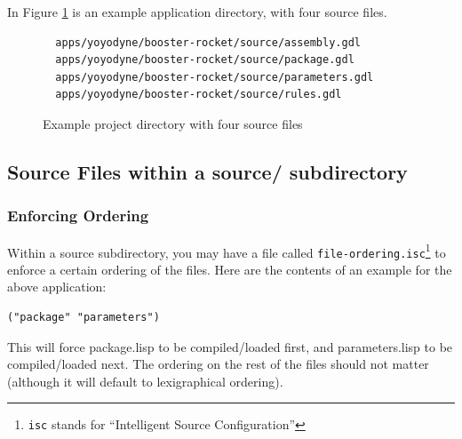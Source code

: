 \documentclass [11pt]{book}
\begin{document}
In Figure 
\ref{fig:yoyodyne-base} is an example application directory, with four source files.


\begin{figure}
\begin{lrbox}{\boxedverb}
\begin{minipage}{\linewidth}

\begin{verbatim}
  apps/yoyodyne/booster-rocket/source/assembly.gdl
  apps/yoyodyne/booster-rocket/source/package.gdl
  apps/yoyodyne/booster-rocket/source/parameters.gdl
  apps/yoyodyne/booster-rocket/source/rules.gdl

\end{verbatim}
\end{minipage}
\end{lrbox}
\fbox{\usebox{\boxedverb}}

\caption{Example project directory with four source files}

\label{fig:yoyodyne-base}

\end{figure}


\subsection{Source Files within a source/ subdirectory}

\label{subsec:sourcefileswithinasource/subdirectory}



\subsubsection{Enforcing Ordering}

\label{subsubsec:enforcingordering}



Within a source subdirectory, you may have a file called \texttt{file-ordering.isc}\footnote{\texttt{isc} stands for ``Intelligent Source Configuration''} to enforce a certain ordering of the files. Here are
the contents of an example for the above application:



\begin{verbatim}("package" "parameters")
\end{verbatim}

This will force package.lisp to be compiled/loaded first, and
parameters.lisp to be compiled/loaded next. The ordering on the rest
of the files should not matter (although it will default to
lexigraphical ordering).
\end{document}
